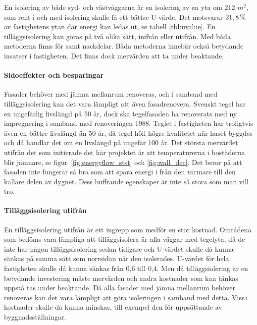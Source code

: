 En isolering av både syd- och västväggarna är en isolering av en yta om 212 $\unit{m^2}$, som rent i och med isolering skulle få ett bättre U-värde. Det motsvarar $\unit[21,8]{\%}$ av fastighetens ytan där energi kan ledas ut, se tabell \ref{tbl:uvalue}.
En tilläggsisolering kan göras på två olika sätt, inifrån eller utifrån. Med båda metoderna finns för samt nackdelar. Båda metoderna innebär också betydande insatser i fastigheten. Det finns dock mervärden att ta under beaktande. 

\paragraph{Sidoeffekter och besparingar}
Fasader behöver med jämna mellanrum renoveras, och i samband med tilläggsisolering kan det vara lämpligt att även fasadrenovera. Svenskt tegel har en ungefärlig livslängd på 50 år\cite{magnus}, dock ska tegelfasaden ha renoverats med ny impregnering i samband med renoveringen 1988. Teglet i fastigheten har troligtvis även en bättre livslängd än 50 år,  då tegel höll högre kvalitetet när huset byggdes och då handlar det om en livslängd på ungefär 100 år. Det största mervärdet utifrån det som initierade det här projektet är att temperaturerna i bostäderna blir jämnare, se figur~\ref{fig:energyflow_stst} och \ref{fig:wall_dec}. Det beror på att fasaden inte fungerar så bra som att spara energi i från den varmare till den kallare delen av dygnet. Dess buffrande egenskaper är inte så stora som man vill tro.

\paragraph{Tilläggsisolering utifrån}
En tilläggsisolering utifrån är ett ingrepp som medför en stor kostnad. Områdena som bedöms vara lämpliga att tilläggsisolera är alla väggar med tegelyta, då de inte har någon tilläggsisolering sedan tidigare och U-värdet skulle då kunna sänkas på samma sätt som norrsidan när den isolerades. U-värdet för hela fastigheten skulle då kunna sänkas från 0,6 till 0,4. Men då tilläggsiolering är en betydande investering måste mervärden och andra kostnader som kan tänkas uppstå tas under beaktande. Då alla fasader med jämna mellanrum behöver renoveras kan det vara lämpligt att göra isoleringen i samband med detta. Vissa kostnader skulle då kunna minskas, till exempel den för uppsättande av byggnadsställningar.

